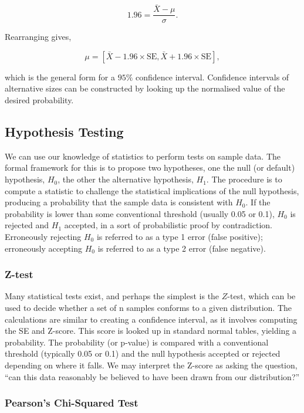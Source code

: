 \documentclass[11pt]{amsart}
\begin{document}
$$1.96 = \frac{\bar{X} - \mu}{\sigma}.$$

Rearranging gives,

$$\mu = [\bar{X} - 1.96\times\text{SE}, \bar{X} + 1.96\times\text{SE}],$$

which is the general form for a $95\%$ confidence interval. Confidence intervals of alternative sizes can be constructed by looking up the normalised value of the desired probability.

\subsection{Hypothesis Testing}

We can use our knowledge of statistics to perform tests on sample data. The formal framework for this is to propose two hypotheses, one the null (or default) hypothesis, $H_0$, the other the alternative hypothesis, $H_1$. The procedure is to compute a statistic to challenge the statistical implications of the null hypothesis, producing a probability that the sample data is consistent with $H_0$. If the probability is lower than some conventional threshold (usually 0.05 or 0.1), $H_0$ is rejected and $H_1$ accepted, in a sort of probabilistic proof by contradiction. Erroneously rejecting $H_0$ is referred to as a type 1 error (false positive); erroneously accepting $H_0$ is referred to as a type 2 error (false negative).

\subsubsection{Z-test}

Many statistical tests exist, and perhaps the simplest is the $Z$-test, which can be used to decide whether a set of n samples conforms to a given distribution. The calculations are similar to creating a confidence interval, as it involves computing the SE and Z-score. This score is looked up in standard normal tables, yielding a probability. The probability (or p-value) is compared with a conventional threshold (typically 0.05 or 0.1) and the null hypothesis accepted or rejected depending on where it falls. We may interpret the Z-score as asking the question, ``can this data reasonably be believed to have been drawn from our distribution?''

\subsubsection{Pearson's Chi-Squared Test}
\end{document}
